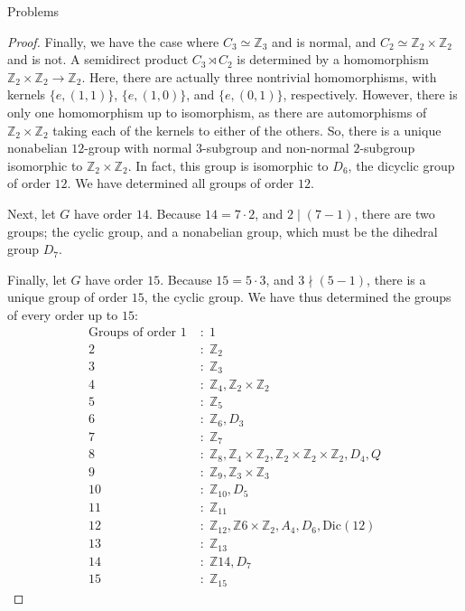 \documentclass[12pt]{article}
\newcommand{\Z}{\mathbb{Z}}
\theoremstyle{definition}
\newenvironment{problem}[2][Problem]{\begin{trivlist}
\item[\hskip \labelsep {\bfseries #1}\hskip \labelsep {\bfseries #2.}]}{\end{trivlist}}
\begin{document}
\begin{section}{Problems}
\begin{problem}{16}
\begin{proof}
		\par Finally, we have the case where $C_3 \simeq \Z_3$ and is normal, and $C_2 \simeq \Z_2 \times \Z_2$ and is not. A semidirect product $C_3 \rtimes C_2$ is determined by a homomorphism $\Z_2 \times \Z_2 \to \Z_2$. Here, there are actually three nontrivial homomorphisms, with kernels $\{e, (1,1)\}$, $\{e, (1,0)\}$, and $\{e, (0,1)\}$, respectively. However, there is only one homomorphism up to isomorphism, as there are automorphisms of $\Z_2 \times \Z_2$ taking each of the kernels to either of the others. So, there is a unique nonabelian $12$-group with normal $3$-subgroup and non-normal $2$-subgroup isomorphic to $\Z_2 \times \Z_2$. In fact, this group is isomorphic to $D_6$, the dicyclic group of order $12$. We have determined all groups of order $12$.
		\par Next, let $G$ have order $14$. Because $14 = 7 \cdot 2$, and $2 \mid (7-1)$, there are two groups; the cyclic group, and a nonabelian group, which must be the dihedral group $D_7$.
		\par Finally, let $G$ have order $15$. Because $15 = 5 \cdot 3$, and $3 \nmid (5-1)$, there is a unique group of order $15$, the cyclic group. We have thus determined the groups of every order up to $15$:
		\begin{align*}
		    \text{Groups of order }1 &\;:\; 1\\
		    2 &\;:\; \Z_2\\
		    3 &\;:\; \Z_3\\
		    4 &\;:\; \Z_4, \Z_2 \times \Z_2\\
		    5 &\;:\; \Z_5\\
		    6 &\;:\; \Z_6, D_3\\
		    7 &\;:\; \Z_7\\
		    8 &\;:\; \Z_8, \Z_4 \times \Z_2, \Z_2 \times \Z_2 \times \Z_2, D_4, Q\\
		    9 &\;:\; \Z_9, \Z_3 \times \Z_3\\
		    10 &\;:\; \Z_{10}, D_5\\
		    11 &\;:\; \Z_{11}\\
		    12 &\;:\;\Z_{12}, \Z{6} \times \Z_2, A_4, D_6, \text{Dic}(12)\\
		    13 &\;:\; \Z_{13}\\
		    14 &\;:\; \Z{14}, D_7\\
		    15 &\;:\; \Z_{15}
		\end{align*}
	\end{proof}
\end{problem}
\end{section}
\end{document}
